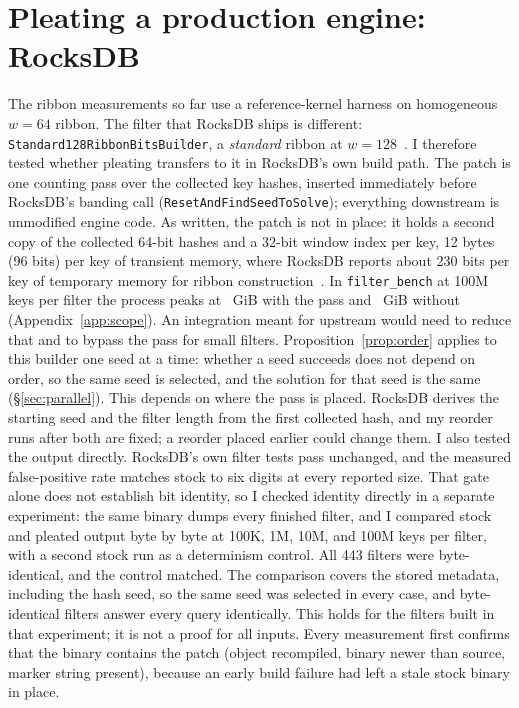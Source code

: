 \documentclass{article}
\begin{document}
\section{Pleating a production engine: RocksDB}\label{sec:rocksdb}
The ribbon measurements so far use a reference-kernel harness on homogeneous $w=64$ ribbon. The filter that
RocksDB ships is different: \texttt{Standard128RibbonBitsBuilder}, a
\emph{standard} ribbon at $w=128$~\citep{rocksdbribbonblog}. I therefore tested whether
pleating transfers to it in RocksDB's own build path. The patch is one
counting pass over the collected key hashes, inserted immediately before RocksDB's banding call
(\texttt{ResetAndFindSeedToSolve}); everything downstream is unmodified engine code. As written, the patch is not in place: it holds a second copy of the collected 64-bit hashes and a 32-bit window index per key, 12 bytes (96 bits) per key of transient memory, where RocksDB reports about 230 bits per key of temporary memory for ribbon construction~\citep{rocksdbribbonblog}. In \texttt{filter\_bench} at 100M keys per filter the process peaks at \esixfbpleated~GiB with the pass and \esixfbstock~GiB without (Appendix~\ref{app:scope}). An integration meant for upstream would need to reduce that and to bypass the pass for small filters. Proposition~\ref{prop:order}
applies to this builder one seed at a time: whether a seed succeeds does not depend on order, so
the same seed is selected, and the solution for that seed is the same (\S\ref{sec:parallel}). This
depends on where the pass is placed. RocksDB derives the starting seed and the filter length from the
first collected hash, and my reorder runs after both are fixed; a reorder placed earlier could
change them. I also tested the output directly. RocksDB's own filter tests pass unchanged, and the
measured false-positive rate matches stock to six digits at every reported size. That gate
alone does not establish bit identity, so I checked identity directly in a separate
experiment: the same binary dumps every finished filter, and I compared stock and pleated
output byte by byte at 100K, 1M, 10M, and 100M keys per filter, with a second stock run as a
determinism control. All 443 filters were byte-identical, and the control matched. The comparison covers the stored metadata, including the hash seed, so the same seed was selected in every case, and byte-identical filters answer every query identically. This holds for
the filters built in that experiment; it is not a proof for all inputs. Every measurement first confirms that the binary contains the patch (object recompiled, binary newer
than source, marker string present), because an early build failure had left a stale stock binary
in place.
\end{document}
